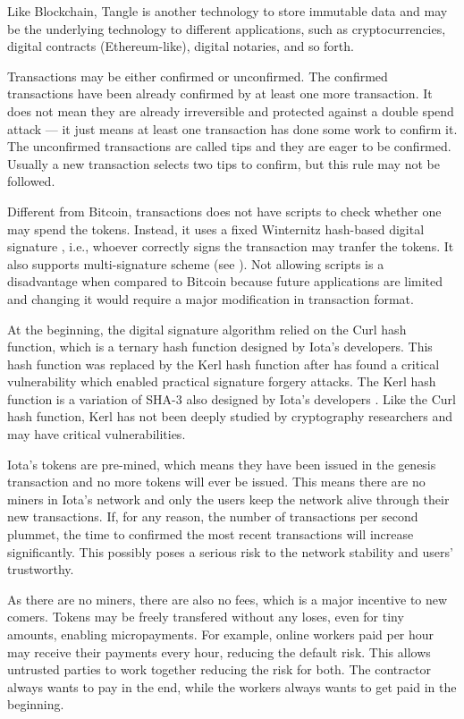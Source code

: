 Like Blockchain, Tangle is another technology to store immutable data and may be the underlying technology to different applications, such as cryptocurrencies, digital contracts (Ethereum-like), digital notaries, and so forth.

Transactions may be either confirmed or unconfirmed. The confirmed transactions have been already confirmed by at least one more transaction. It does not mean they are already irreversible and protected against a double spend attack --- it just means at least one transaction has done some work to confirm it. The unconfirmed transactions are called tips and they are eager to be confirmed. Usually a new transaction selects two tips to confirm, but this rule may not be followed.

Different from Bitcoin, transactions does not have scripts to check whether one may spend the tokens. Instead, it uses a fixed Winternitz hash-based digital signature \citep{dods2005hash}, i.e., whoever correctly signs the transaction may tranfer the tokens. It also supports multi-signature scheme (see \cite{iotamultisign}). Not allowing scripts is a disadvantage when compared to Bitcoin because future applications are limited and changing it would require a major modification in transaction format.

At the beginning, the digital signature algorithm relied on the Curl hash function, which is a ternary hash function designed by Iota's developers. This hash function was replaced by the Kerl hash function after \cite{heilman2017iota} has found a critical vulnerability which enabled practical signature forgery attacks. The Kerl hash function is a variation of SHA-3 also designed by Iota's developers \citep{iotakerl}. Like the Curl hash function, Kerl has not been deeply studied by cryptography researchers and may have critical vulnerabilities.

Iota's tokens are pre-mined, which means they have been issued in the genesis transaction and no more tokens will ever be issued. This means there are no miners in Iota's network and only the users keep the network alive through their new transactions. If, for any reason, the number of transactions per second plummet, the time to confirmed the most recent transactions will increase significantly. This possibly poses a serious risk to the network stability and users' trustworthy.

As there are no miners, there are also no fees, which is a major incentive to new comers. Tokens may be freely transfered without any loses, even for tiny amounts, enabling micropayments. For example, online workers paid per hour may receive their payments every hour, reducing the default risk. This allows untrusted parties to work together reducing the risk for both. The contractor always wants to pay in the end, while the workers always wants to get paid in the beginning.

